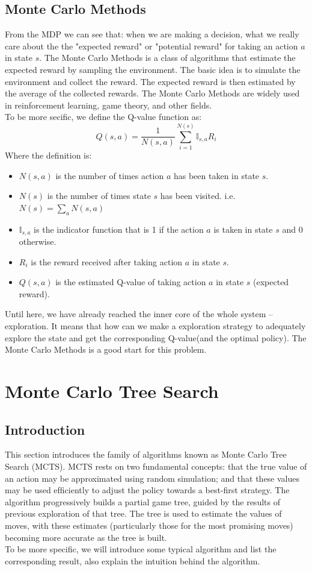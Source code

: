 \documentclass[11pt]{article}
\theoremstyle{definitionstyle}
\begin{document}
\subsection{Monte Carlo Methods}
From the MDP we can see that: when we are making a decision, what we really care about the the "expected reward" or "potential reward" for taking an action $a$ in state $s$. The Monte Carlo Methods is a class of algorithms that estimate the expected reward by sampling the environment. The basic idea is to simulate the environment and collect the reward. The expected reward is then estimated by the average of the collected rewards. The Monte Carlo Methods are widely used in reinforcement learning, game theory, and other fields.\\
To be more secific, we define the Q-value function as:
\[
    Q(s,a)=\frac{1}{N(s,a)}\sum_{i=1}^{N(s)}\mathbb{I}_{s,a}R_i
\] 
Where the definition is:
\begin{itemize}
    \item $N(s,a)$ is the number of times action $a$ has been taken in state $s$.
    \item $N(s)$ is the number of times state $s$ has been visited. i.e. $N(s)=\sum_a N(s,a)$
    \item $\mathbb{I}_{s,a}$ is the indicator function that is 1 if the action $a$ is taken in state $s$ and 0 otherwise.
    \item $R_i$ is the reward received after taking action $a$ in state $s$.
    \item $Q(s,a)$ is the estimated Q-value of taking action $a$ in state $s$ (expected reward).
\end{itemize}
Until here, we have already reached the inner core of the whole system -- exploration. It means that how can we make a exploration strategy to adequately explore the state and get the corresponding Q-value(and the optimal policy). The Monte Carlo Methods is a good start for this problem.
\section{Monte Carlo Tree Search}
\subsection{Introduction}
This section introduces the family of algorithms known as Monte Carlo Tree Search (MCTS). MCTS rests on two
fundamental concepts: that the true value of an action may be approximated using random simulation; and that
these values may be used efﬁciently to adjust the policy towards a best-ﬁrst strategy. The algorithm progressively builds a partial game tree, guided by the results of previous exploration of that tree. The tree is used to estimate the values of moves, with these estimates (particularly
those for the most promising moves) becoming more accurate as the tree is built.\\
To be more specific, we will introduce some typical algorithm and list the corresponding result, also explain the intuition behind the algorithm.
\end{document}
